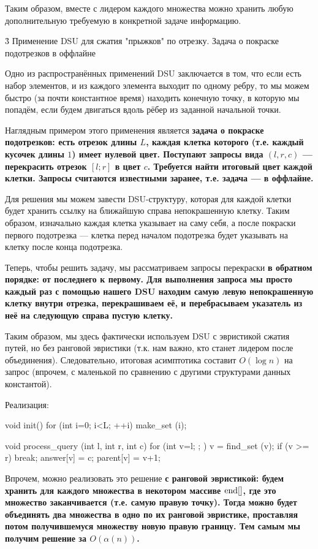 Таким образом, вместе с лидером каждого множества можно хранить любую дополнительную требуемую в конкретной задаче информацию.



\h3{ Применение DSU для сжатия "прыжков" по отрезку. Задача о покраске подотрезков в оффлайне }

Одно из распространённых применений DSU заключается в том, что если есть набор элементов, и из каждого элемента выходит по одному ребру, то мы можем быстро (за почти константное время) находить конечную точку, в которую мы попадём, если будем двигаться вдоль рёбер из заданной начальной точки.

Наглядным примером этого применения является \bf{задача о покраске подотрезков}: есть отрезок длины $L$, каждая клетка которого (т.е. каждый кусочек длины $1$) имеет нулевой цвет. Поступают запросы вида $(l,r,c)$ --- перекрасить отрезок $[l;r]$ в цвет $c$. Требуется найти итоговый цвет каждой клетки. Запросы считаются известными заранее, т.е. задача --- в оффлайне.

Для решения мы можем завести DSU-структуру, которая для каждой клетки будет хранить ссылку на ближайшую справа непокрашенную клетку. Таким образом, изначально каждая клетка указывает на саму себя, а после покраски первого подотрезка --- клетка перед началом подотрезка будет указывать на клетку после конца подотрезка.

Теперь, чтобы решить задачу, мы рассматриваем запросы перекраски \bf{в обратном порядке}: от последнего к первому. Для выполнения запроса мы просто каждый раз с помощью нашего DSU находим самую левую непокрашенную клетку внутри отрезка, перекрашиваем её, и перебрасываем указатель из неё на следующую справа пустую клетку.

Таким образом, мы здесь фактически используем DSU с эвристикой сжатия путей, но без ранговой эвристики (т.к. нам важно, кто станет лидером после объединения). Следовательно, итоговая асимптотика составит $O(\log n)$ на запрос (впрочем, с маленькой по сравнению с другими структурами данных константой).

Реализация:

\code
void init() {
	for (int i=0; i<L; ++i)
		make_set (i);
}

void process_query (int l, int r, int c) {
	for (int v=l; ; ) {
		v = find_set (v);
		if (v >= r)  break;
		answer[v] = c;
		parent[v] = v+1;
	}
}
\endcode

Впрочем, можно реализовать это решение \bf{с ранговой эвристикой}: будем хранить для каждого множества в некотором массиве ${\rm end}[]$, где это множество заканчивается (т.е. самую правую точку). Тогда можно будет объединять два множества в одно по их ранговой эвристике, проставляя потом получившемуся множеству новую правую границу. Тем самым мы получим решение за $O(\alpha(n))$.



